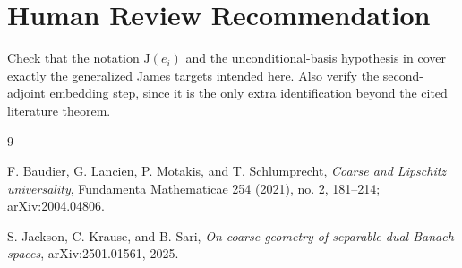 \documentclass[11pt]{article}
\newcommand{\J}{\mathrm{J}}
\begin{document}
\section*{Human Review Recommendation}

Check that the notation $\J(e_i)$ and the unconditional-basis hypothesis in
\cite{JKS} cover exactly the generalized James targets intended here. Also
verify the second-adjoint embedding step, since it is the only extra
identification beyond the cited literature theorem.

\begin{thebibliography}{9}

F. Baudier, G. Lancien, P. Motakis, and T. Schlumprecht,
\emph{Coarse and Lipschitz universality},
Fundamenta Mathematicae 254 (2021), no. 2, 181--214;
arXiv:2004.04806.

S. Jackson, C. Krause, and B. Sari,
\emph{On coarse geometry of separable dual Banach spaces},
arXiv:2501.01561, 2025.

\end{thebibliography}
\end{document}

